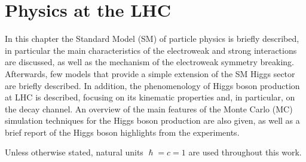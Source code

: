 \chapter{Physics at the LHC}\label{chap1}
\thispagestyle{empty}

In this chapter the Standard Model (SM) of particle physics is briefly described, in particular the main characteristics of the electroweak and strong interactions are discussed, as well as the mechanism of the electroweak symmetry breaking. Afterwards, few models that provide a simple extension of the SM Higgs sector are briefly described.
In addition, the phenomenology of Higgs boson production at LHC is described, focusing on its kinematic properties and, in particular, on the \hww decay channel. An overview of the main features of the Monte Carlo (MC) simulation techniques for the Higgs boson production are also given, as well as a brief report of the Higgs boson highlights from the experiments.

\noindent Unless otherwise stated, natural units $\hslash=c=1$ are used throughout this work.


%
%




